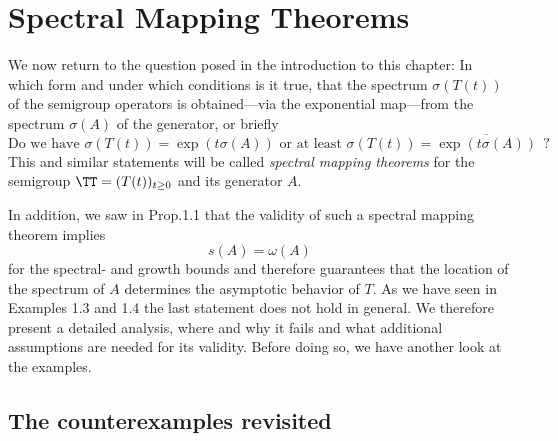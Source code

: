 \section{Spectral Mapping Theorems}\label{sec:a3-6}
We now return to the question posed in the introduction to this chapter: In which form and under which conditions is it true, that the spectrum $\sigma(T(t))$ of the semigroup operators is obtained---via the exponential map---from the spectrum $\sigma(A)$ of the generator, or briefly
\[
\text{Do we have } \sigma(T(t)) = \exp(t\sigma(A)) \text{ or at least }
 \sigma(T(t)) = \overline{\exp(t\sigma(A))} ~~?
\]
This and similar statements will be called \emph{spectral mapping theorems} for the semigroup $\TT = (T(t))_{t \geq 0}$ and its generator $A$.


In addition, we saw in Prop.1.1 that the validity of such a spectral mapping theorem implies
\[
s(A) = \omega(A)
\]
for the spectral- and growth bounds and therefore guarantees that the location of the spectrum of $A$ determines the asymptotic behavior of $T$.
As we have seen in Examples 1.3 and 1.4 the last statement does not hold in general.
We therefore present a detailed analysis, where and why it fails and what additional assumptions are needed for its validity.
Before doing so, we have another look at the examples.

\subsection{The counterexamples revisited}\label{subsec:a3-6.1}


